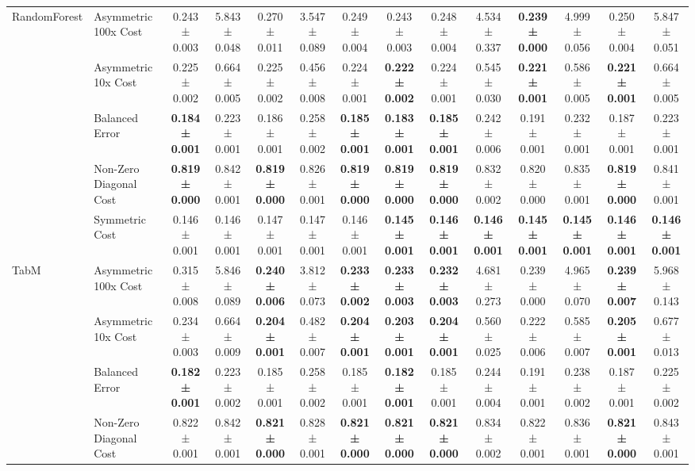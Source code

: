 \begin{table}[H]
{\begin{tabular}{llcccccccccccc}
\cline{1-14}
\multirow[t]{5}{*}{RandomForest} & Asymmetric 100x Cost & 0.243 ± 0.003 & 5.843 ± 0.048 & 0.270 ± 0.011 & 3.547 ± 0.089 & 0.249 ± 0.004 & 0.243 ± 0.003 & 0.248 ± 0.004 & 4.534 ± 0.337 & \textbf{0.239 ± 0.000} & 4.999 ± 0.056 & 0.250 ± 0.004 & 5.847 ± 0.051 \\
 & Asymmetric 10x Cost & 0.225 ± 0.002 & 0.664 ± 0.005 & 0.225 ± 0.002 & 0.456 ± 0.008 & 0.224 ± 0.001 & \textbf{0.222 ± 0.002} & 0.224 ± 0.001 & 0.545 ± 0.030 & \textbf{0.221 ± 0.001} & 0.586 ± 0.005 & \textbf{0.221 ± 0.001} & 0.664 ± 0.005 \\
 & Balanced Error & \textbf{0.184 ± 0.001} & 0.223 ± 0.001 & 0.186 ± 0.001 & 0.258 ± 0.002 & \textbf{0.185 ± 0.001} & \textbf{0.183 ± 0.001} & \textbf{0.185 ± 0.001} & 0.242 ± 0.006 & 0.191 ± 0.001 & 0.232 ± 0.001 & 0.187 ± 0.001 & 0.223 ± 0.001 \\
 & Non-Zero Diagonal Cost & \textbf{0.819 ± 0.000} & 0.842 ± 0.001 & \textbf{0.819 ± 0.000} & 0.826 ± 0.001 & \textbf{0.819 ± 0.000} & \textbf{0.819 ± 0.000} & \textbf{0.819 ± 0.000} & 0.832 ± 0.002 & 0.820 ± 0.000 & 0.835 ± 0.001 & \textbf{0.819 ± 0.000} & 0.841 ± 0.001 \\
 & Symmetric Cost & 0.146 ± 0.001 & 0.146 ± 0.001 & 0.147 ± 0.001 & 0.147 ± 0.001 & 0.146 ± 0.001 & \textbf{0.145 ± 0.001} & \textbf{0.146 ± 0.001} & \textbf{0.146 ± 0.001} & \textbf{0.145 ± 0.001} & \textbf{0.145 ± 0.001} & \textbf{0.146 ± 0.001} & \textbf{0.146 ± 0.001} \\
\cline{1-14}
\multirow[t]{5}{*}{TabM} & Asymmetric 100x Cost & 0.315 ± 0.008 & 5.846 ± 0.089 & \textbf{0.240 ± 0.006} & 3.812 ± 0.073 & \textbf{0.233 ± 0.002} & \textbf{0.233 ± 0.003} & \textbf{0.232 ± 0.003} & 4.681 ± 0.273 & 0.239 ± 0.000 & 4.965 ± 0.070 & \textbf{0.239 ± 0.007} & 5.968 ± 0.143 \\
 & Asymmetric 10x Cost & 0.234 ± 0.003 & 0.664 ± 0.009 & \textbf{0.204 ± 0.001} & 0.482 ± 0.007 & \textbf{0.204 ± 0.001} & \textbf{0.203 ± 0.001} & \textbf{0.204 ± 0.001} & 0.560 ± 0.025 & 0.222 ± 0.006 & 0.585 ± 0.007 & \textbf{0.205 ± 0.001} & 0.677 ± 0.013 \\
 & Balanced Error & \textbf{0.182 ± 0.001} & 0.223 ± 0.002 & 0.185 ± 0.001 & 0.258 ± 0.002 & 0.185 ± 0.001 & \textbf{0.182 ± 0.001} & 0.185 ± 0.001 & 0.244 ± 0.004 & 0.191 ± 0.001 & 0.238 ± 0.002 & 0.187 ± 0.001 & 0.225 ± 0.002 \\
 & Non-Zero Diagonal Cost & 0.822 ± 0.001 & 0.842 ± 0.001 & \textbf{0.821 ± 0.000} & 0.828 ± 0.001 & \textbf{0.821 ± 0.000} & \textbf{0.821 ± 0.000} & \textbf{0.821 ± 0.000} & 0.834 ± 0.002 & 0.822 ± 0.001 & 0.836 ± 0.001 & \textbf{0.821 ± 0.000} & 0.843 ± 0.001 \\

\end{tabular}}
\end{table}
